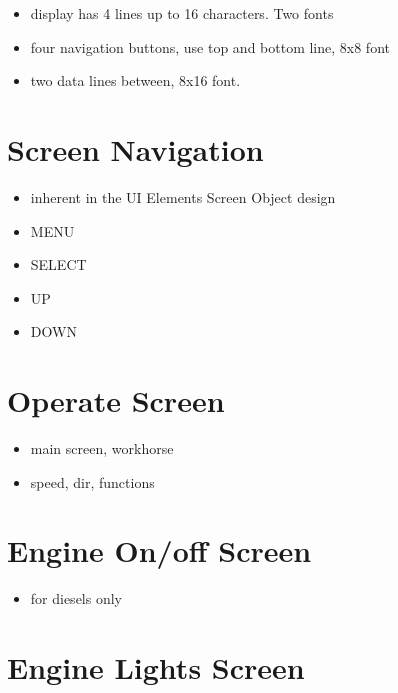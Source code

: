 \begin{itemize}
\begin{itemize}
\item display has 4 lines up to 16 characters. Two fonts
\item four navigation buttons, use top and bottom line, 8x8 font
\item two data lines between, 8x16 font.
\end{itemize}
\end{itemize}

\section{Screen Navigation}

\begin{itemize}
\begin{itemize}
\item inherent in the UI Elements Screen Object design
\item MENU
\item SELECT
\item UP
\item DOWN
\end{itemize}
\end{itemize}

\section{Operate Screen}

\begin{itemize}
\begin{itemize}
\item main screen, workhorse
\item speed, dir, functions
\end{itemize}
\end{itemize}

\section{Engine On/off Screen}

\begin{itemize}
\begin{itemize}
\item for diesels only
\end{itemize}
\end{itemize}

\section{Engine Lights Screen}

